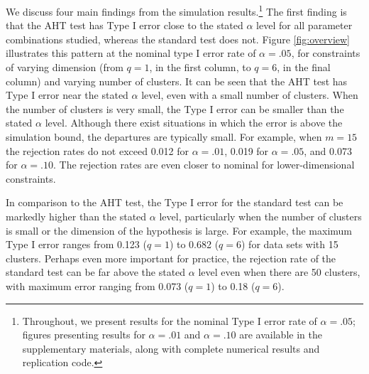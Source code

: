 \documentclass[12pt]{article}\usepackage[]{graphicx}\usepackage[]{color}
\begin{document}
We discuss four main findings from the simulation results.\footnote{
Throughout, we present results for the nominal Type I error rate of $\alpha = .05$; figures presenting results for $\alpha = .01$ and $\alpha = .10$ are available in the supplementary materials, along with complete numerical results and replication code.}
The first finding is that the AHT test has Type I error close to the stated $\alpha$ level for all parameter combinations studied, whereas the standard test does not. 
Figure \ref{fig:overview} illustrates this pattern at the nominal type I error rate of $\alpha = .05$, for constraints of varying dimension (from $q = 1$, in the first column, to $q = 6$, in the final column) and varying number of clusters.
It can be seen that the AHT test has Type I error near the stated $\alpha$ level, even with a small number of clusters.
When the number of clusters is very small, the Type I error can be smaller than the stated $\alpha$ level. 
Although there exist situations in which the error is above the simulation bound, the departures are typically small. For example, when $m = 15$ the rejection rates do not exceed 0.012 for $\alpha = .01$, 0.019 for $\alpha = .05$, and 0.073 for $\alpha = .10$.
The rejection rates are even closer to nominal for lower-dimensional constraints.

In comparison to the AHT test, the Type I error for the standard test can be markedly higher than the stated $\alpha$ level, particularly when the number of clusters is small or the dimension of the hypothesis is large. 
For example, the maximum Type I error ranges from 0.123 ($q = 1$) to 0.682 ($q = 6$) for data sets with 15 clusters.
Perhaps even more important for practice, the rejection rate of the standard test can be far above the stated $\alpha$ level even when there are 50 clusters, with maximum error ranging from 0.073 ($q = 1$) to 0.18 ($q = 6$).
\end{document}
